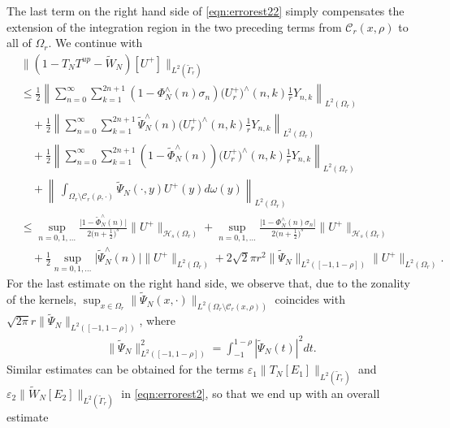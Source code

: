 \documentclass[a4paper, 10pt]{article}
\numberwithin{equation}{section}
\theoremstyle{definition}
\begin{document}
The last term on the right hand side of \eqref{eqn:errorest22} simply compensates the extension of the integration region in the two preceding terms from $\mathcal{C}_r(x,\rho)$ to all of $\Omega_r$. We continue with 
\begin{equation}\label{eqn:errorest23}
\begin{aligned}
& \|(1-{T}_{N}{T}^{up}-\tilde{W}_{N})[U^+]\|_{L^2(\tilde{\Gamma}_r)}
\\&\leq \frac{1}{2}\left\|\sum_{n=0}^\infty\sum_{k=1}^{2n+1}(1-{\Phi}_N^\wedge(n)\sigma_n)\big(U_r^+\big)^\wedge(n,k)\frac{1}{r}Y_{n,k}\right\|_{L^2(\Omega_r)}
\\&\quad+\frac{1}{2}\left\|\sum_{n=0}^\infty\sum_{k=1}^{2n+1}\tilde{\Psi}_{N}^\wedge(n)\big(U_r^+\big)^\wedge(n,k)\frac{1}{r}Y_{n,k}\right\|_{L^2(\Omega_r)}
\\&\quad+\frac{1}{2}\left\|\sum_{n=0}^\infty\sum_{k=1}^{2n+1}(1-\tilde{\Phi}_N^\wedge(n))\big(U_r^+\big)^\wedge(n,k)\frac{1}{r}Y_{n,k}\right\|_{L^2(\Omega_r)}
\\&\quad+\left\|\,\int_{\Omega_r\setminus\mathcal{C}_r(\rho,\cdot)}\tilde{\Psi}_{N}(\cdot,y) U^+(y)d\omega(y)\right\|_{L^2(\Omega_r)}
\\&\leq\sup_{n=0,1,\ldots}\frac{\big|1-\tilde{\Phi}_N^\wedge(n)\big|}{2\big(n+\frac{1}{2}\big)^s}\|U^+\|_{\mathcal{H}_s(\Omega_r)}+\sup_{n=0,1,\ldots}\frac{\big|1-{\Phi}_{N}^\wedge(n)\sigma_n\big|}{2\big(n+\frac{1}{2}\big)^s}\|U^+\|_{\mathcal{H}_s(\Omega_r)}
\\&\quad+\frac{1}{2}\sup_{n=0,1,\ldots}\big|\tilde{\Psi}_{N}^\wedge(n)\big|\|U^+\|_{L^2(\Omega_r)}+2\sqrt{2}\pi r^2\big\|\tilde{\Psi}_{N}\big\|_{L^2([-1,1-\rho])}\|U^+\|_{L^2(\Omega_r)}.
\end{aligned}
\end{equation}
For the last estimate on the right hand side, we observe that, due to the zonality of the kernels, $\sup_{x\in\Omega_r}\|\tilde{\Psi}_{N}(x,\cdot)\|_{L^2(\Omega_r\setminus\mathcal{C}_r(x,\rho))}$ coincides with $\sqrt{2\pi} r\|\tilde{\Psi}_{N}\|_{L^2([-1,1-\rho])}$, where
\begin{align}\label{eqn:1dint}
\big\|\tilde{\Psi}_{N}\big\|_{L^2([-1,1-\rho])}^2=\int_{-1}^{1-\rho}|\tilde{\Psi}_{N}(t)|^2dt.
\end{align}
Similar estimates can be obtained for the terms $\varepsilon_1\|{T}_{N}[E_1]\|_{L^2(\tilde{\Gamma}_r)}$ and $\varepsilon_2\|\tilde{W}_{N}[E_2]\|_{L^2(\tilde{\Gamma}_r)}$ in \eqref{eqn:errorest2}, so that we end up with an overall estimate
\end{document}
